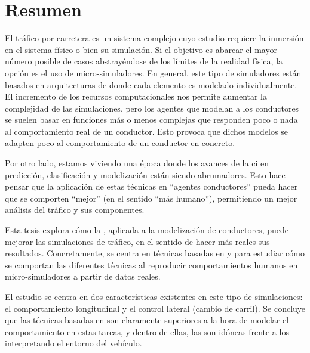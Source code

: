 \cleardoublepage
\thispagestyle{empty}
\chapter*{Resumen}
\begin{fullwidth}
	El tráfico por carretera es un sistema complejo cuyo estudio requiere la inmersión en el sistema físico o bien su simulación. Si el objetivo es abarcar el mayor número posible de casos abstrayéndose de los límites de la realidad física, la opción es el uso de micro-simuladores. En general, este tipo de simuladores están basados en arquitecturas de  donde cada elemento es modelado individualmente. El incremento de los recursos computacionales nos permite aumentar la complejidad de las simulaciones, pero los agentes que modelan a los conductores se suelen basar en funciones más o menos complejas que responden poco o nada al comportamiento real de un conductor. Esto provoca que dichos modelos se adapten poco al comportamiento de un conductor en concreto.
	
	Por otro lado, estamos viviendo una época donde los avances de la \Acrfull{ci} en predicción, clasificación y modelización están siendo abrumadores. Esto hace pensar que la aplicación de estas técnicas en \enquote{agentes conductores} pueda hacer que se comporten \enquote{mejor} (en el sentido \enquote{más humano}), permitiendo un mejor análisis del tráfico y sus componentes.
	
	Esta tesis explora cómo la , aplicada a la modelización de conductores, puede mejorar las simulaciones de tráfico, en el sentido de hacer más reales sus resultados. Concretamente, se centra en técnicas basadas en  y  para estudiar cómo se comportan las diferentes técnicas al reproducir  comportamientos humanos en micro-simuladores a partir de datos reales.
	
	El estudio se centra en dos características existentes en este tipo de simulaciones: el comportamiento longitudinal y el control lateral (cambio de carril). Se concluye que las técnicas basadas en  son claramente superiores a la hora de modelar el comportamiento en estas tareas, y dentro de ellas, las  son idóneas frente a los  interpretando el entorno del vehículo.
	

\end{fullwidth}
